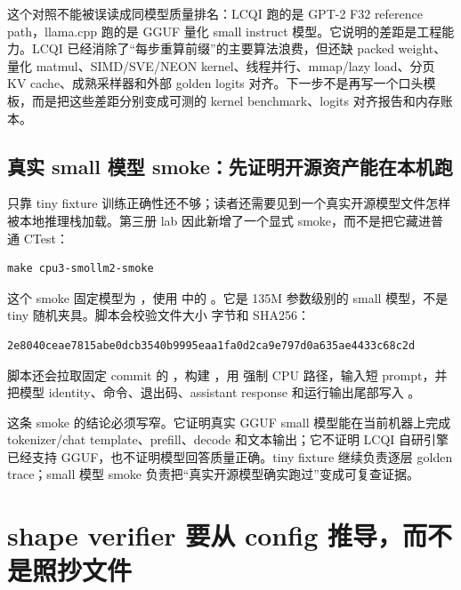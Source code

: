 这个对照不能被误读成同模型质量排名：LCQI 跑的是 GPT-2 F32 reference path，llama.cpp 跑的是 GGUF 量化 small instruct 模型。它说明的差距是工程能力。LCQI 已经消除了“每步重算前缀”的主要算法浪费，但还缺 packed weight、量化 matmul、SIMD/SVE/NEON kernel、线程并行、mmap/lazy load、分页 KV cache、成熟采样器和外部 golden logits 对齐。下一步不是再写一个口头模板，而是把这些差距分别变成可测的 kernel benchmark、logits 对齐报告和内存账本。

\subsection{真实 small 模型 smoke：先证明开源资产能在本机跑}

只靠 tiny fixture 训练正确性还不够；读者还需要见到一个真实开源模型文件怎样被本地推理栈加载。第三册 lab 因此新增了一个显式 smoke，而不是把它藏进普通 CTest：

\begin{lstlisting}[numbers=none,caption={运行 SmolLM2 small 开源模型 smoke}]
make cpu3-smollm2-smoke
\end{lstlisting}

这个 smoke 固定模型为 ，使用  中的 。它是 135M 参数级别的 small 模型，不是 tiny 随机夹具。脚本会校验文件大小  字节和 SHA256：

\begin{lstlisting}[numbers=none,caption={SmolLM2 small GGUF 身份}]
2e8040ceae7815abe0dcb3540b9995eaa1fa0d2ca9e797d0a635ae4433c68c2d
\end{lstlisting}

脚本还会拉取固定 commit 的 ，构建 ，用  强制 CPU 路径，输入短 prompt，并把模型 identity、命令、退出码、assistant response 和运行输出尾部写入 。

这条 smoke 的结论必须写窄。它证明真实 GGUF small 模型能在当前机器上完成 tokenizer/chat template、prefill、decode 和文本输出；它不证明 LCQI 自研引擎已经支持 GGUF，也不证明模型回答质量正确。tiny fixture 继续负责逐层 golden trace；small 模型 smoke 负责把“真实开源模型确实跑过”变成可复查证据。

\section{shape verifier 要从 config 推导，而不是照抄文件}

